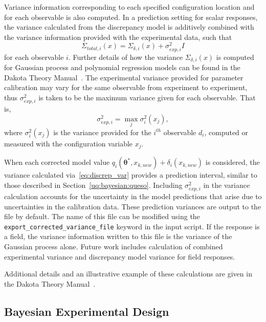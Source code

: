Variance information corresponding to each specified configuration location 
and for each observable is also computed. In a prediction setting for scalar 
responses, the variance calculated from the discrepancy model is additively 
combined with the variance information provided with the experimental data, 
such that
\begin{equation}
\label{eq:discrep_var}
\Sigma_{total,i}(x) = \Sigma_{\delta, i}(x) + \sigma^{2}_{exp,i} I
\end{equation}
for each observable $i$. Further details of how the variance 
$\Sigma_{\delta,i}(x)$ is computed for Gaussian process and polynomial 
regression models can be found in the Dakota Theory Manual~\cite{TheoMan}. The 
experimental variance provided for parameter calibration may vary for the
same observable from experiment to experiment, thus $\sigma^{2}_{exp,i}$ is
taken to be the maximum variance given for each observable. That is,
\begin{equation}
\sigma^2_{exp,i} = \max_{j} \sigma^2_{i}(x_j), 
\end{equation}
where $\sigma^2_{i}(x_j)$ is the variance provided for the $i^{th}$ observable
$d_i$, computed or measured with the configuration variable $x_j$. 

When each corrected model value $q_i(\boldsymbol{\theta}^{*}, x_{k, new}) +
\delta_i(x_{k,new})$ is considered, the variance calculated 
via~\ref{eq:discrep_var} provides a prediction interval, similar to those 
described in Section~\ref{uq:bayesian:queso}. Including $\sigma^{2}_{exp,i}$ 
in the variance calculation accounts for the uncertainty in the model 
predictions that arise due to uncertainties in the calibration data. These
prediction variances are output to the file 
 by default. The name of
this file can be modified using the \texttt{export\_corrected\_variance\_file} 
keyword in the input script. If the response is a field, the variance 
information written to this file is the variance of the Gaussian process alone.
Future work includes calculation of combined experimental variance and 
discrepancy model variance for field responses.

Additional details and an illustrative example of these calculations are given 
in the Dakota Theory Manual~\cite{TheoMan}.

\subsection{Bayesian Experimental Design}
\label{sec:bayes_expdesign}

